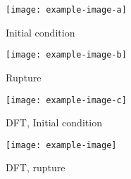 \documentclass{article}
\begin{document}
\begin{figure}[ht]
	\label{ fig7}
	\begin{minipage}[b]{0.5\linewidth}
		\centering
		\texttt{[image: example-image-a]}
		\caption{Initial condition}
		\vspace{4ex}
	\end{minipage}%
	\begin{minipage}[b]{0.5\linewidth}
		\centering
		\texttt{[image: example-image-b]}
		\caption{Rupture}
		\vspace{4ex}
	\end{minipage}
	\begin{minipage}[b]{0.5\linewidth}
		\centering
		\texttt{[image: example-image-c]}
		\caption{DFT, Initial condition}
		\vspace{4ex}
	\end{minipage}%
	\begin{minipage}[b]{0.5\linewidth}
		\centering
		\texttt{[image: example-image]}
		\caption{DFT, rupture}
		\vspace{4ex}
	\end{minipage}
\end{figure}
\end{document}
